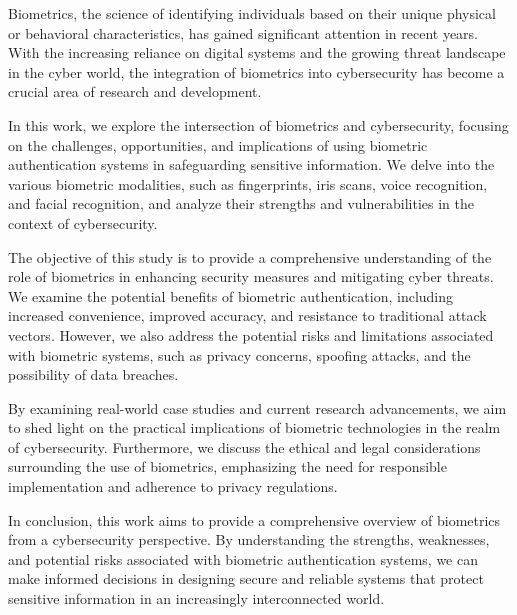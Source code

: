 

\hspace{1 em}Biometrics, the science of identifying individuals based on their unique physical or behavioral characteristics, has gained significant attention in recent years. With the increasing reliance on digital systems and the growing threat landscape in the cyber world, the integration of biometrics into cybersecurity has become a crucial area of research and development.

In this work, we explore the intersection of biometrics and cybersecurity, focusing on the challenges, opportunities, and implications of using biometric authentication systems in safeguarding sensitive information. We delve into the various biometric modalities, such as fingerprints, iris scans, voice recognition, and facial recognition, and analyze their strengths and vulnerabilities in the context of cybersecurity.

The objective of this study is to provide a comprehensive understanding of the role of biometrics in enhancing security measures and mitigating cyber threats. We examine the potential benefits of biometric authentication, including increased convenience, improved accuracy, and resistance to traditional attack vectors. However, we also address the potential risks and limitations associated with biometric systems, such as privacy concerns, spoofing attacks, and the possibility of data breaches.

By examining real-world case studies and current research advancements, we aim to shed light on the practical implications of biometric technologies in the realm of cybersecurity. Furthermore, we discuss the ethical and legal considerations surrounding the use of biometrics, emphasizing the need for responsible implementation and adherence to privacy regulations.

In conclusion, this work aims to provide a comprehensive overview of biometrics from a cybersecurity perspective. By understanding the strengths, weaknesses, and potential risks associated with biometric authentication systems, we can make informed decisions in designing secure and reliable systems that protect sensitive information in an increasingly interconnected world.
